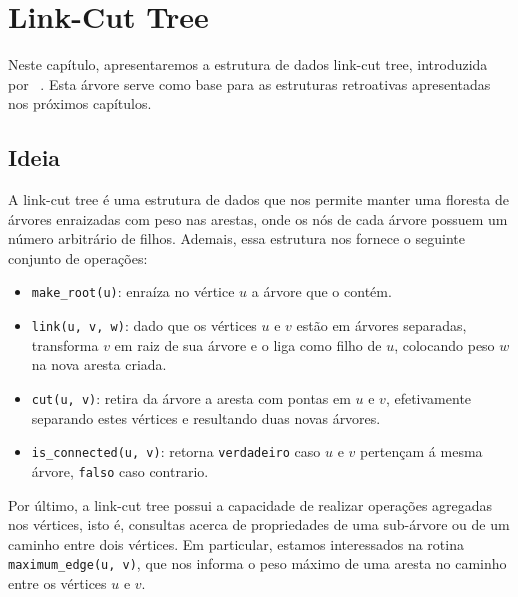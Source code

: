
\chapter{Link-Cut Tree}
\label{cap:link-cut-trees}

Neste capítulo, apresentaremos a estrutura de dados link-cut tree, introduzida por ~\citet{10.1145/800076.802464}. Esta árvore serve como base para as estruturas retroativas apresentadas nos próximos capítulos.

\section{Ideia}
\label{sec:lct-ideia}

A link-cut tree é uma estrutura de dados que nos permite manter uma floresta de árvores enraizadas com peso nas arestas, onde os nós de cada árvore possuem um número arbitrário de filhos. Ademais, essa estrutura nos fornece o seguinte conjunto de operações:

\begin{itemize}
    \item \texttt{make\_root(u)}: enraíza no vértice $u$ a árvore que o contém.
    \item \texttt{link(u, v, w)}: dado que os vértices $u$ e $v$ estão em árvores separadas, transforma $v$ em raiz de sua árvore e o liga como filho de $u$, colocando peso $w$ na nova aresta criada.
    \item \texttt{cut(u, v)}: retira da árvore a aresta com pontas em $u$ e $v$, efetivamente separando estes vértices e resultando duas novas árvores.
    \item \texttt{is\_connected(u, v)}: retorna \texttt{verdadeiro} caso $u$ e $v$ pertençam á mesma árvore, \texttt{falso} caso contrario.
\end{itemize}

Por último, a link-cut tree possui a capacidade de realizar operações agregadas nos vértices, isto é, consultas acerca de propriedades de uma sub-árvore ou de um caminho entre dois vértices. Em particular, estamos interessados na rotina \texttt{maximum\_edge(u, v)}, que nos informa o peso máximo de uma aresta no caminho entre os vértices $u$ e $v$.

